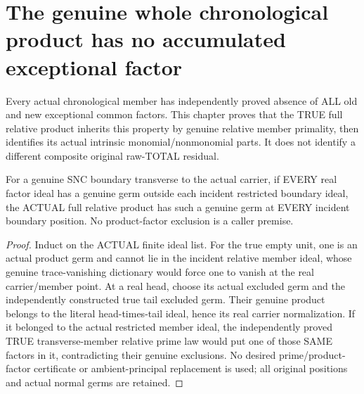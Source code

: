 \section{The genuine whole chronological product has no accumulated exceptional factor}

Every actual chronological member has independently proved absence of ALL
old and new exceptional common factors. This chapter proves that the TRUE
full relative product inherits this property by genuine relative member
primality, then identifies its actual intrinsic monomial/nonmonomial parts.
It does not identify a different composite original raw-TOTAL residual.

\begin{theorem}
\label{hir:sharp-actual-finite-relative-product-no-exceptional-factor}
\leanok
For a genuine SNC boundary transverse to the actual carrier, if EVERY real
factor ideal has a genuine germ outside each incident restricted boundary
ideal, the ACTUAL full relative product has such a genuine germ at EVERY
incident boundary position. No product-factor exclusion is a caller premise.
\end{theorem}
\begin{proof}
Induct on the ACTUAL finite ideal list. For the true empty unit, one is an
actual product germ and cannot lie in the incident relative member ideal,
whose genuine trace-vanishing dictionary would force one to vanish at the
real carrier/member point. At a real head, choose its actual excluded germ
and the independently constructed true tail excluded germ. Their genuine
product belongs to the literal head-times-tail ideal, hence its real carrier
normalization. If it belonged to the actual restricted member ideal, the
independently proved TRUE transverse-member relative prime law would put
one of those SAME factors in it, contradicting their genuine exclusions.
No desired prime/product-factor certificate or ambient-principal replacement
is used; all original positions and actual normal germs are retained.
\end{proof}

